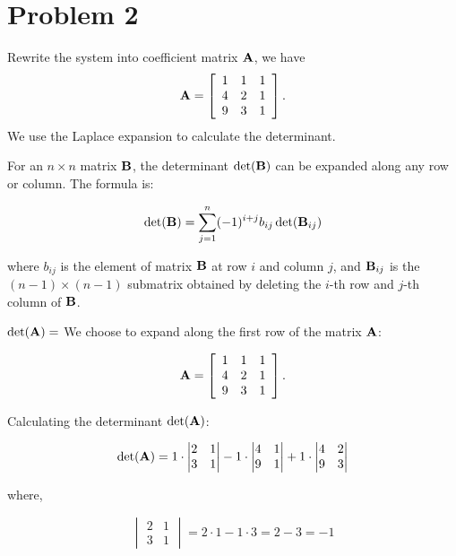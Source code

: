 \documentclass[12pt,a4paper]{article}
\begin{document}
\section*{Problem 2}
\begin{solution}
Rewrite the system into coefficient matrix $\mathbf{A}$, we have
\begin{equation}\label{mat1}
\mathbf{A}=
\left[
\begin{array}{ccc}
1 & 1 & 1 \\
4 & 2 & 1 \\
9 & 3 & 1 
\end{array}
\right].
\end{equation}
We use the Laplace expansion to calculate the determinant.
\begin{definition}
    For an \(n \times n\) matrix \(\mathbf{B}\), the determinant \(\det(\mathbf{B})\) can be expanded along any row or column. The formula is:

\[
\det(\mathbf{B}) = \sum_{j=1}^{n} (-1)^{i+j} b_{ij} \det(\mathbf{B}_{ij})
\]

where \(b_{ij}\) is the element of matrix \(\mathbf{B}\) at row \(i\) and column \(j\), and \(\mathbf{B}_{ij}\) is the \((n-1) \times (n-1)\) submatrix obtained by deleting the \(i\)-th row and \(j\)-th column of \(\mathbf{B}\).
\end{definition}
$\det(\mathbf{A}) = $
We choose to expand along the first row of the matrix \(\mathbf{A}\):

\[
\mathbf{A}=
\left[
\begin{array}{ccc}
1 & 1 & 1 \\
4 & 2 & 1 \\
9 & 3 & 1
\end{array}
\right].
\]

Calculating the determinant \(\det(\mathbf{A})\):

\[
\det(\mathbf{A}) = 1 \cdot 
\begin{vmatrix}
2 & 1 \\
3 & 1
\end{vmatrix}
- 1 \cdot 
\begin{vmatrix}
4 & 1 \\
9 & 1
\end{vmatrix}
+ 1 \cdot 
\begin{vmatrix}
4 & 2 \\
9 & 3
\end{vmatrix}
\]

where,

\[
\begin{vmatrix}
2 & 1 \\
3 & 1
\end{vmatrix}
= 2 \cdot 1 - 1 \cdot 3 = 2 - 3 = -1
\]


\end{solution}
\end{document}
